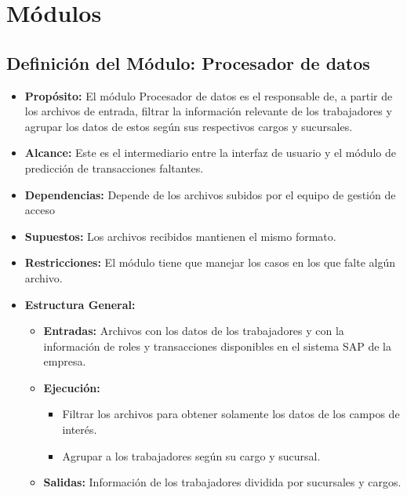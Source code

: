 \documentclass[11pt,letterpaper]{article}
\begin{document}
\section{Módulos}



\subsection{Definición del Módulo: Procesador de datos}
\begin{itemize}

\item \textbf{Propósito:} El módulo Procesador de datos es el responsable de, a partir de los archivos de entrada, filtrar la información relevante de los trabajadores y agrupar los datos de estos según sus respectivos cargos y sucursales. 

\item \textbf{Alcance:} Este es el intermediario entre la interfaz de usuario y el módulo de predicción de transacciones faltantes. 

\item \textbf{Dependencias:}
Depende de los archivos subidos por el equipo de gestión de acceso
\item \textbf{Supuestos:} 
Los archivos recibidos mantienen el mismo formato.
    


\item \textbf{Restricciones:} El módulo tiene que manejar los casos en los que falte algún archivo.

\item \textbf{Estructura General:}
\begin{itemize}
    \item \textbf{Entradas:} Archivos con los datos de los trabajadores y con la información de roles y transacciones disponibles en el sistema SAP de la empresa.
    \item \textbf{Ejecución:}
    \begin{itemize}
        \item Filtrar los archivos para obtener solamente los datos de los campos de interés.
        \item Agrupar a los trabajadores según su cargo y sucursal.
    \end{itemize}
    \item \textbf{Salidas: } Información de los trabajadores dividida por sucursales y cargos.
\end{itemize}
\end{itemize}
\end{document}
